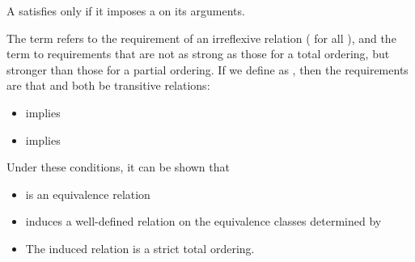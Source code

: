 \begin{itemdescr}
\pnum
A  satisfies  only if
it imposes a  on its arguments.

\pnum
The term
refers to the
requirement of an irreflexive relation ( for all ),
and the term
to requirements that are not as strong as
those for a total ordering,
but stronger than those for a partial
ordering.
If we define
as
,
then the requirements are that
and
both be transitive relations:

\begin{itemize}
\item
{}
implies
\item
{}
implies
\end{itemize}

\pnum
\begin{note}
Under these conditions, it can be shown that
\begin{itemize}
\item
{}
is an equivalence relation
\item
{}
induces a well-defined relation on the equivalence
classes determined by
\item
The induced relation is a strict total ordering.
\end{itemize}
\end{note}
\end{itemdescr}
